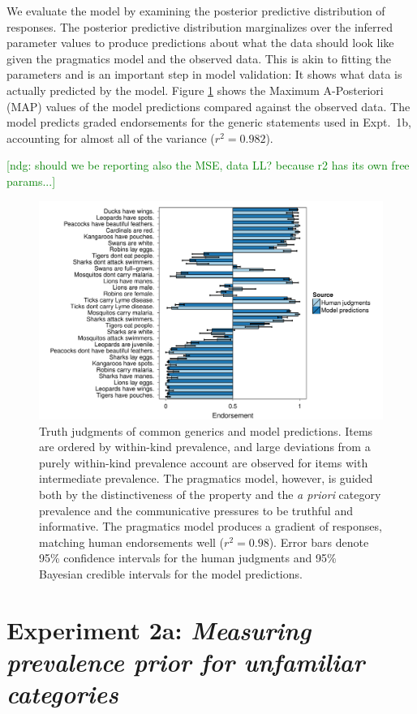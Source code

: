 \documentclass[10pt,letterpaper]{article}
\newcommand{\ndg}[1]{\textcolor{Green}{[ndg: #1]}}
\begin{document}
We evaluate the model by examining the posterior predictive distribution of responses. 
The posterior predictive distribution marginalizes over the inferred parameter values to produce predictions about what the data should look like given the pragmatics model and the observed data. 
This is akin to fitting the parameters and is an important step in model validation: It shows what data is actually predicted by the model. 
Figure \ref{fig:tj1b} shows the Maximum A-Posteriori (MAP) values of the model predictions compared against the observed data. 
The model predicts graded endorsements for the generic statements used in Expt.~1b, accounting for almost all of the variance ($r^2 = 0.982$). 

\ndg{should we be reporting also the MSE, data LL? because r2 has its own free params...}

\begin{figure}
\centering
    \includegraphics[width=\columnwidth]{tj_n100-postPred-byItem.pdf}
    \caption{Truth judgments of common generics and model predictions. 
Items are ordered by within-kind prevalence, and large deviations from a purely within-kind prevalence account are observed for items with intermediate prevalence. 
The pragmatics model, however, is guided both by the distinctiveness of the property and the \emph{a priori} category prevalence and the communicative pressures to be truthful and informative.
The pragmatics model produces a gradient of responses, matching human endorsements well ($r^2 = 0.98$).
Error bars denote 95\% confidence intervals for the human judgments and 95\% Bayesian credible intervals for the model predictions.}
  \label{fig:tj1b}
\end{figure}


\section{Experiment 2a: \emph{Measuring prevalence prior for unfamiliar categories}}
\end{document}
